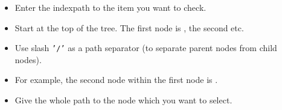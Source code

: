 \begin{itemize}
\item Enter the indexpath to the item you want to check.
\item Start at the top of the tree. The first node is , the second  etc.
\item Use slash {\tt '/'} as a path separator (to separate parent nodes from child nodes).
\item For example, the second node within the first node is . 
\item Give the whole path to the node which you want to select.
\end{itemize}

